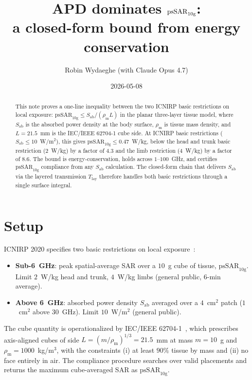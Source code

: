 \documentclass[11pt,a4paper]{article}
\title{%
  APD dominates $\psSAR$:\\
  a closed-form bound from energy conservation%
}
\author{Robin Wydaeghe (with Claude Opus 4.7)}
\date{2026-05-08}
\theoremstyle{definition}
\theoremstyle{remark}
\newcommand{\APD}{S_{\mathrm{ab}}}
\newcommand{\Tlay}{T_{\mathrm{lay}}}
\newcommand{\psSAR}{\ensuremath{\mathrm{psSAR}_{10\mathrm{g}}}}
\newcommand{\rhom}{\rho_{\mathrm{m}}}
\begin{document}
\maketitle

\begin{abstract}
This note proves a one-line inequality between the two ICNIRP basic
restrictions on local exposure: $\psSAR \le \APD/(\rhom L)$ in the planar
three-layer tissue model, where $\APD$ is the absorbed power density at
the body surface, $\rhom$ is tissue mass density, and $L = 21.5$~mm is
the IEC/IEEE 62704-1 cube side. At ICNIRP basic restrictions
($\APD \le 10$~W/m$^2$), this gives $\psSAR \le 0.47$~W/kg, below
the head and trunk basic restriction (2~W/kg) by a factor of $4.3$ and
the limb restriction (4~W/kg) by a factor of $8.6$. The bound is
energy-conservation, holds across $1$--$100$~GHz, and certifies $\psSAR$
compliance from any $\APD$ calculation. The closed-form chain that
delivers $\APD$ via the layered transmission $\Tlay$ therefore handles
both basic restrictions through a single surface integral.
\end{abstract}

\section{Setup}\label{sec:setup}

ICNIRP 2020 specifies two basic restrictions on local
exposure~\cite{ICNIRP2020}:

\begin{itemize}\setlength{\itemsep}{2pt}
  \item \textbf{Sub-6~GHz}: peak spatial-average SAR over a
        $10$~g cube of tissue, $\psSAR$. Limit $2$~W/kg head and trunk,
        $4$~W/kg limbs (general public, $6$-min average).
  \item \textbf{Above 6~GHz}: absorbed power density $\APD$ averaged
        over a $4$~cm$^2$ patch ($1$~cm$^2$ above $30$~GHz). Limit
        $10$~W/m$^2$ (general public).
\end{itemize}

\noindent
The cube quantity is operationalized by IEC/IEEE
62704-1~\cite{62704-1}, which prescribes axis-aligned cubes of side
$L = (m/\rhom)^{1/3} = 21.5$~mm at mass $m = 10$~g and
$\rhom = 1000$~kg/m$^3$, with the constraints (i) at least $90\%$ tissue
by mass and (ii) no face entirely in air. The compliance procedure
searches over valid placements and returns the maximum cube-averaged SAR
as $\psSAR$.
\end{document}
